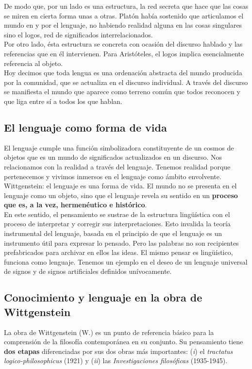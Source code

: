 \documentclass[a4paper, 11pt, twocolumn, spanish]{article}
\begin{document}
De modo que, por un lado es una estructura, la red secreta que hace
que las cosas se miren en cierta forma unas a otras. Platón había
sostenido que articulamos el mundo en y por el lenguaje, no habiendo
realidad alguna en las cosas singulares sino el logos, red de
significados interrelacionados.\\
Por otro lado, ésta estructura se concreta con ocasión del discurso
hablado y las referencias que en él intervienen. Para Aristóteles, el
logos implica esencialmente referencia al objeto.\\
Hoy decimos que toda lengua es una ordenación abstracta del mundo
producida por la comunidad, que se actualiza en el discurso
individual. A través del discurso se manifiesta el mundo que aparece
como terreno común que todos reconocen y que liga entre sí a todos los
que hablan.

\subsection{El lenguaje como forma de vida}
\label{sec:org8ef068e}
El lenguaje cumple una función simbolizadora constituyente de un
cosmos de objetos que es un mundo de significados actualizados en un
discurso. Nos relacionamos con la realidad a través del
lenguaje. Tenemos realidad porque pertenecemos y vivimos inmersos en
el lenguaje como ámbito envolvente. Wittgenstein: el lenguaje es una
forma de vida. El mundo no se presenta en el lenguaje como un objeto,
sino que el lenguaje revela su sentido en un \textbf{proceso que es, a la
vez, hermenéutico e histórico}.\\

En este sentido, el pensamiento se sustrae de la estructura
lingüística con el proceso de interpretar y corregir sus
interpretaciones. Esto invalida la teoría instrumental del lenguaje,
basada en el principio de que el lenguaje es un instrumento útil para
expresar lo pensado. Pero las palabras no son recipientes
prefabricados para archivar en ellos las ideas. El mismo pensar es
lingüístico, funciona como lenguaje. Tenemos un ejemplo en el deseo de
un lenguaje universal de signos y de signos artificiales definidos
unívocamente.

\subsection{Conocimiento y lenguaje en la obra de Wittgenstein}
\label{sec:org156dcbd}
La obra de Wittgenstein (W.) es un punto de referencia básico para la
comprensión de la filosofía contemporánea en su conjunto. Su
pensamiento tiene \textbf{dos etapas} diferenciadas por sus dos obras más
importantes: (\emph{i}) el \emph{tractatus logico-philosophicus} (1921) y (\emph{ii}) las
\emph{Investigaciones filosóficas} (1935-1945).
\end{document}
